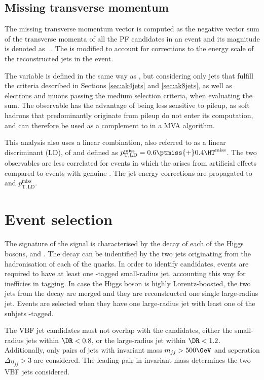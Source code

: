 \subsection{Missing transverse momentum}
\label{MET}


The missing transverse momentum vector \ptvecmiss is computed as the negative vector sum of the transverse momenta of all the PF candidates in an event and its magnitude is denoted as \ptmiss~\cite{CMS:2019ctu}. The \ptmiss is modified to account for corrections to the energy scale of the reconstructed jets in the event.


The variable \HTmiss is defined in the same way as \ptmiss, but considering only jets that fulfill the criteria described in Sections \ref{sec:ak4jets} and \ref{sec:ak8jets}, as well as electrons and muons passing the medium selection criteria, when evaluating the \pt sum. The observable \HTmiss has the advantage of being less sensitive to pileup, as soft hadrons that predominantly originate from pileup do not enter its computation, and can therefore be used as a complement to \ptmiss in a MVA algorithm.

This analysis also uses a linear combination, also referred to as a linear discriminant (LD), of \ptmiss and \HTmiss defined as $p_{\mathrm{T,LD}}^{\text{miss}} =0.6  \ptmiss {+} 0.4  \HTmiss$. The two observables are less correlated for events in which the \ptmiss arises from artificial effects compared to events with genuine \ptmiss. The jet energy corrections are propagated to \HTmiss and $p_{\mathrm{T,LD}}^{\text{miss}}$.

\section{Event selection}
\label{Event_selection}

The signature of the \bbWW signal is characterised by the decay of each of the Higgs bosons, \Hbb and \HWW. The \Hbb decay can be indentified by the two jets originating from the hadronisation of each of the \Pbottom quarks. In order to identify \Hbb candidates, events are required to have at least one \Pbottom-tagged small-radius jet, accounting this way for inefficies in \Pbottom tagging. In case the Higgs boson is highly Lorentz-boosted, the two \Pbottom jets from the \Hbb decay are merged and they are reconstructed one single large-radius jet. Events are selected when they have one large-radius jet with least one of the subjets \Pbottom-tagged.

The VBF jet candidates must not overlap with the \Hbb candidates, either the small-radius jets within $\DR<0.8$, or the large-radius jet within $\DR<1.2$. Additionally, only pairs of jets with invariant mass $m_{jj}>500\GeV$ and seperation $\Delta\eta_{jj}>3$ are considered. The leading pair in invariant mass determines the two VBF jets considered.

